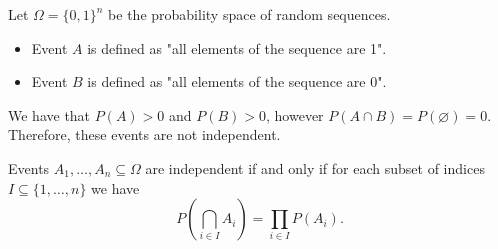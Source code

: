 \begin{example}
Let $\Omega=\{ 0,1 \}^{n}$ be the probability space of random sequences. 
\begin{itemize}
\item Event $A$ is defined as "all elements of the sequence are 1".
\item Event $B$ is defined as "all elements of the sequence are 0".
\end{itemize}
We have that $P(A)>0$ and $P(B)>0$, however $P(A\cap B)=P(\varnothing)=0$. Therefore, these events are not independent.
\end{example}
\begin{definition}
Events $A_{1},\dots,A_{n}\subseteq \Omega$ are independent if and only if for each subset of indices $I\subseteq \{ 1,\dots,n \}$ we have
$$
P\left( \bigcap _{i\in I}A_{i} \right)=\prod _{i\in I}P(A_{i}).
$$
\end{definition}
